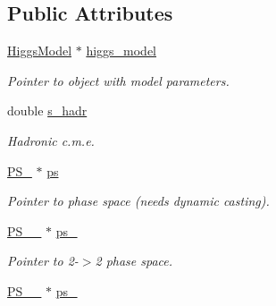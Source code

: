 \subsection*{Public Attributes}
\begin{DoxyCompactItemize}
\item 
\hypertarget{classintegrand__par_a9becf94ac239a82b946f53e36c75c83c}{}\hyperlink{classHiggsModel}{Higgs\+Model} $\ast$ \hyperlink{classintegrand__par_a9becf94ac239a82b946f53e36c75c83c}{higgs\+\_\+model}\label{classintegrand__par_a9becf94ac239a82b946f53e36c75c83c}

\begin{DoxyCompactList}\small\item\em Pointer to object with model parameters. \end{DoxyCompactList}\item 
\hypertarget{classintegrand__par_a02a52a8cc95edeadf423f181936617d0}{}double \hyperlink{classintegrand__par_a02a52a8cc95edeadf423f181936617d0}{s\+\_\+hadr}\label{classintegrand__par_a02a52a8cc95edeadf423f181936617d0}

\begin{DoxyCompactList}\small\item\em Hadronic c.\+m.\+e. \end{DoxyCompactList}\item 
\hypertarget{classintegrand__par_a9c52a4045c079f7314cbc8a876f98238}{}\hyperlink{classPS__2}{P\+S\+\_} $\ast$ \hyperlink{classintegrand__par_a9c52a4045c079f7314cbc8a876f98238}{ps}\label{classintegrand__par_a9c52a4045c079f7314cbc8a876f98238}

\begin{DoxyCompactList}\small\item\em Pointer to phase space (needs dynamic casting). \end{DoxyCompactList}\item 
\hypertarget{classintegrand__par_a588525dccf7b407fc34fac6b41df8f8b}{}\hyperlink{classPS__2__2}{P\+S\+\_\+\_} $\ast$ \hyperlink{classintegrand__par_a588525dccf7b407fc34fac6b41df8f8b}{ps\+\_}\label{classintegrand__par_a588525dccf7b407fc34fac6b41df8f8b}

\begin{DoxyCompactList}\small\item\em Pointer to 2-\/$>$2 phase space. \end{DoxyCompactList}\item 
\hypertarget{classintegrand__par_a1cc9803bc5e7116240d02723ea2a963b}{}\hyperlink{classPS__2__3}{P\+S\+\_\+\_} $\ast$ \hyperlink{classintegrand__par_a1cc9803bc5e7116240d02723ea2a963b}{ps\+\_}\label{classintegrand__par_a1cc9803bc5e7116240d02723ea2a963b}


\end{DoxyCompactItemize}
